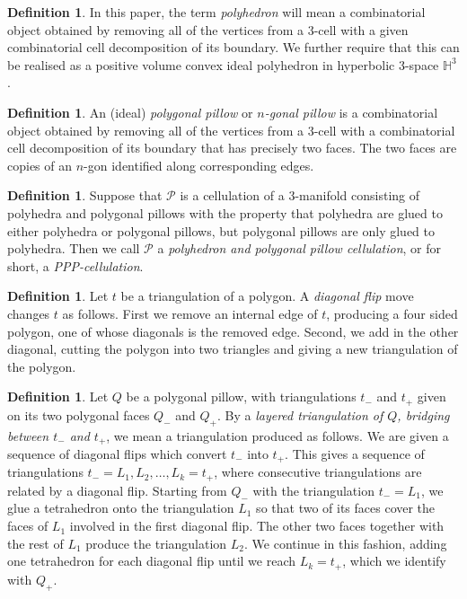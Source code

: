 \documentclass[12pt]{amsart}
\theoremstyle{definition}
\newtheorem{defn}[thm]{Definition}
\theoremstyle{remark}
\def\H{\mathbb{H}}
\begin{document}
\begin{defn}
In this paper, the term \emph{polyhedron} will mean a combinatorial object obtained by removing all of the vertices from a 3-cell with a given combinatorial cell decomposition of its boundary. We further require that this can be realised as a positive volume convex ideal polyhedron in hyperbolic 3-space $\H^3$.
\end{defn}
\begin{defn}
An (ideal) \emph{polygonal pillow} or  \emph{$n$-gonal pillow} is a combinatorial object obtained by removing all of the vertices from a 3-cell with a combinatorial cell decomposition of its boundary that has precisely two faces. The two faces are copies of an $n$-gon identified along corresponding edges.
\end{defn}
\begin{defn}
Suppose that $\mathcal{P}$ is a cellulation of a 3-manifold consisting of polyhedra 
and polygonal pillows with the property that polyhedra are glued to either polyhedra or polygonal pillows, but polygonal pillows are only glued to polyhedra. Then we call $\mathcal{P}$ a \emph{ polyhedron and polygonal pillow cellulation}, or for short, a \emph{ PPP-cellulation}. 
\end{defn}
\begin{defn}\label{diagonal flip}
Let $t$ be a triangulation of a polygon. A \emph{diagonal flip} move changes $t$ as follows. First we remove an internal edge of $t$, producing a four sided polygon, one of whose diagonals is the removed edge. Second, we add in the other diagonal, cutting the polygon into two triangles and giving a new triangulation of the polygon.
\end{defn}

\begin{defn}\label{layered_triang_of_polygonal_pillow}
Let $Q$ be a polygonal pillow, with triangulations $t_-$ and $t_+$ given on its two polygonal faces $Q_-$ and $Q_+$. By a \emph{layered triangulation of $Q$, bridging between $t_-$ and $t_+$}, we mean a triangulation produced as follows. We are given a sequence of diagonal flips which convert $t_-$ into $t_+$. This gives a sequence of triangulations $t_-=L_1, L_2, \ldots, L_k=t_+$, where consecutive triangulations are related by a diagonal flip. Starting from $Q_-$ with the triangulation $t_-=L_1$, we glue a tetrahedron onto the triangulation $L_1$ so that two of its faces cover the faces of $L_1$ involved in the first diagonal flip. The other two faces together with the rest of $L_1$ produce the triangulation $L_2$. We continue in this fashion, adding one tetrahedron for each diagonal flip until we reach $L_k=t_+$, which we identify with $Q_+$.
\end{defn}
\end{document}
